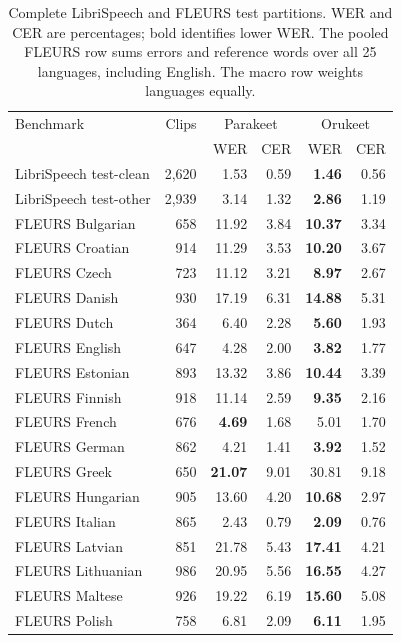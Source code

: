\begin{table}[!ht]
\centering
\caption{Complete LibriSpeech and FLEURS test partitions. WER and CER are percentages; bold identifies lower WER. The pooled FLEURS row sums errors and reference words over all 25 languages, including English. The macro row weights languages equally.}
\label{tab:current-standard}
\small
\setlength{\tabcolsep}{5pt}
\renewcommand{\arraystretch}{1.02}
\begin{tabular}{lrrrrr}
\toprule
Benchmark & Clips & \multicolumn{2}{c}{Parakeet} & \multicolumn{2}{c}{Orukeet}\\
 & & WER & CER & WER & CER\\
\midrule
LibriSpeech test-clean & 2,620 & 1.53 & 0.59 & \textbf{1.46} & 0.56\\
LibriSpeech test-other & 2,939 & 3.14 & 1.32 & \textbf{2.86} & 1.19\\
\midrule
FLEURS Bulgarian & 658 & 11.92 & 3.84 & \textbf{10.37} & 3.34\\
FLEURS Croatian & 914 & 11.29 & 3.53 & \textbf{10.20} & 3.67\\
FLEURS Czech & 723 & 11.12 & 3.21 & \textbf{8.97} & 2.67\\
FLEURS Danish & 930 & 17.19 & 6.31 & \textbf{14.88} & 5.31\\
FLEURS Dutch & 364 & 6.40 & 2.28 & \textbf{5.60} & 1.93\\
FLEURS English & 647 & 4.28 & 2.00 & \textbf{3.82} & 1.77\\
FLEURS Estonian & 893 & 13.32 & 3.86 & \textbf{10.44} & 3.39\\
FLEURS Finnish & 918 & 11.14 & 2.59 & \textbf{9.35} & 2.16\\
FLEURS French & 676 & \textbf{4.69} & 1.68 & 5.01 & 1.70\\
FLEURS German & 862 & 4.21 & 1.41 & \textbf{3.92} & 1.52\\
FLEURS Greek & 650 & \textbf{21.07} & 9.01 & 30.81 & 9.18\\
FLEURS Hungarian & 905 & 13.60 & 4.20 & \textbf{10.68} & 2.97\\
FLEURS Italian & 865 & 2.43 & 0.79 & \textbf{2.09} & 0.76\\
FLEURS Latvian & 851 & 21.78 & 5.43 & \textbf{17.41} & 4.21\\
FLEURS Lithuanian & 986 & 20.95 & 5.56 & \textbf{16.55} & 4.27\\
FLEURS Maltese & 926 & 19.22 & 6.19 & \textbf{15.60} & 5.08\\
FLEURS Polish & 758 & 6.81 & 2.09 & \textbf{6.11} & 1.95\\

\end{tabular}
\end{table}
